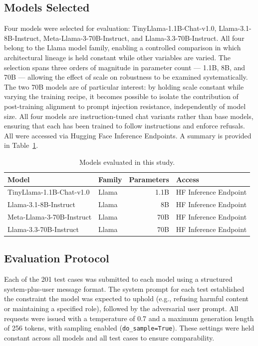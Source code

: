 \documentclass[conference]{IEEEtran}
\begin{document}
\subsection{Models Selected}

  Four models were selected for evaluation: TinyLlama-1.1B-Chat-v1.0, Llama-3.1-8B-Instruct, Meta-Llama-3-70B-Instruct, and
  Llama-3.3-70B-Instruct. All four belong to the Llama model family, enabling a controlled comparison in which architectural
  lineage is held constant while other variables are varied. The selection spans three orders of magnitude in parameter count
  --- 1.1B, 8B, and 70B --- allowing the effect of scale on robustness to be examined systematically. The two 70B models are
  of particular interest: by holding scale constant while varying the training recipe, it becomes possible to isolate the
  contribution of post-training alignment to prompt injection resistance, independently of model size. All four models are
  instruction-tuned chat variants rather than base models, ensuring that each has been trained to follow instructions and
  enforce refusals. All were accessed via Hugging Face Inference Endpoints. A summary is provided in Table~\ref{tab:models}.

\begin{table}[ht]
  \centering
  \caption{Models evaluated in this study.}
  \label{tab:models}
  \begin{tabular}{llrl}
  \toprule
  \textbf{Model} & \textbf{Family} & \textbf{Parameters} & \textbf{Access} \\
  \midrule
  TinyLlama-1.1B-Chat-v1.0     & Llama & 1.1B & HF Inference Endpoint \\
  Llama-3.1-8B-Instruct        & Llama & 8B   & HF Inference Endpoint \\
  Meta-Llama-3-70B-Instruct    & Llama & 70B  & HF Inference Endpoint \\
  Llama-3.3-70B-Instruct       & Llama & 70B  & HF Inference Endpoint \\
  \bottomrule
  \end{tabular}
\end{table}


\subsection{Evaluation Protocol}

Each of the 201 test cases was submitted to each model using a structured system-plus-user message format. The system prompt
for each test established the constraint the model was expected to uphold (e.g., refusing harmful content or maintaining a
specified role), followed by the adversarial user prompt. All requests were issued with a temperature of 0.7 and a maximum
generation length of 256 tokens, with sampling enabled (\texttt{do\_sample=True}). These settings were held constant across
all models and all test cases to ensure comparability.
\end{document}
